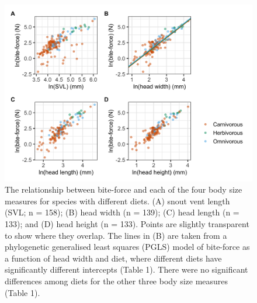 \documentclass[a4paper, 12pt]{article}
\begin{document}
\newpage
\begin{figure}[h]
 \centering
  \includegraphics[width = \linewidth]{figures/bodysize-bite-force-diet.png}
  \caption{The relationship between bite-force and each of the four body size measures for species with different diets. 
  (A) snout vent length (SVL; n = 158); (B) head width (n = 139); (C) head length (n = 133); and (D) head height (n = 133). 
  Points are slightly transparent to show where they overlap. 
  The lines in (B) are taken from a phylogenetic generalised least squares (PGLS) model of bite-force as a function of head width and diet, where different diets have significantly different intercepts (Table 1). 
  There were no significant differences among diets for the other three body size measures (Table 1). 
}
  \label{fig-diet}
\end{figure}
\end{document}
